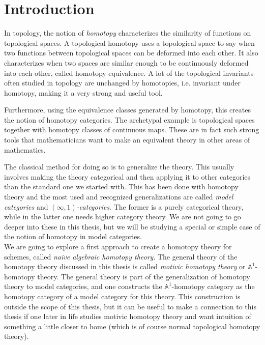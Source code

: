 \section*{Introduction}
%
In topology, the notion of \emph{homotopy} characterizes the similarity of functions on topological spaces. A topological homotopy uses a topological space to say when two functions between topological spaces can be deformed into each other. 
It also characterizes when two spaces are similar enough to be continuously deformed into each other, called homotopy equivalence. A lot of the topological invariants often studied in topology are unchanged by homotopies, i.e. invariant under homotopy, making it a very strong and useful tool. 

Furthermore, using the equivalence classes generated by homotopy, this creates the notion of homotopy categories. The archetypal example is topological spaces together with homotopy classes of continuous maps. These are in fact such strong tools that mathematicians want to make an equivalent theory in other areas of mathematics. 

The classical method for doing so is to generalize the theory. This usually involves making the theory categorical and then applying it to other categories than the standard one we started with. This has been done with homotopy theory and the most used and recognized generalizations are called \emph{model categories} and \emph{\((\infty, 1)\)-categories}. The former is a purely categorical theory, while in the latter one needs higher category theory. 
We are not going to go deeper into these in this thesis, but we will be studying a special or simple case of the notion of homotopy in model categories. \\


We are going to explore a first approach to create a homotopy theory for schemes, called \emph{naive algebraic homotopy theory}. The general theory of the homotopy theory discussed in this thesis is called \emph{motivic homotopy theory} or \(\mathbb{A}^1\)-homotopy theory. 
The general theory is part of the generalization of homotopy theory to model categories, and one constructs the \(\mathbb{A}^1\)-homotopy category as the homotopy category of a model category for this theory. This construction is outside the scope of this thesis, but it can be useful to make a connection to this thesis if one later in life studies motivic homotopy theory and want intuition of something a little closer to home (which is of course normal topological homotopy theory). \\



